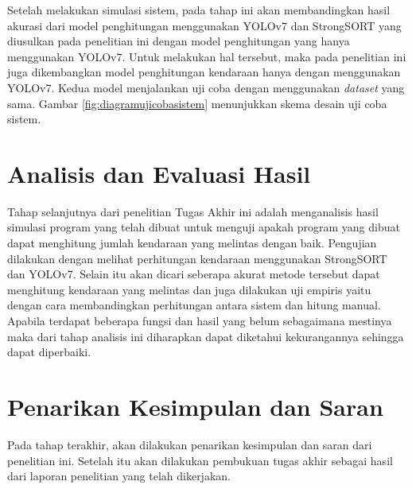 Setelah melakukan simulasi sistem, pada tahap ini akan membandingkan hasil akurasi dari model penghitungan menggunakan YOLOv7 dan StrongSORT yang diusulkan pada penelitian ini dengan model penghitungan yang hanya menggunakan YOLOv7. Untuk melakukan hal tersebut, maka pada penelitian ini juga dikembangkan model penghitungan kendaraan hanya dengan menggunakan YOLOv7. Kedua model menjalankan uji coba dengan menggunakan \emph{dataset} yang sama. Gambar \ref{fig:diagramujicobasistem} menunjukkan skema desain uji coba sistem.

\section{Analisis dan Evaluasi Hasil}
Tahap selanjutnya dari penelitian Tugas Akhir ini adalah 
menganalisis hasil simulasi program yang telah dibuat untuk 
menguji apakah program yang dibuat dapat menghitung jumlah kendaraan yang melintas dengan baik. Pengujian dilakukan dengan melihat perhitungan kendaraan menggunakan StrongSORT dan YOLOv7. Selain itu akan dicari seberapa akurat metode tersebut dapat menghitung kendaraan yang melintas dan juga dilakukan uji empiris yaitu dengan cara membandingkan perhitungan antara sistem dan hitung manual. Apabila terdapat beberapa fungsi dan hasil yang belum sebagaimana mestinya maka dari tahap analisis ini diharapkan dapat diketahui kekurangannya sehingga dapat diperbaiki.


\section{Penarikan Kesimpulan dan Saran}

Pada tahap terakhir, akan dilakukan penarikan kesimpulan dan saran dari penelitian ini. Setelah itu akan dilakukan pembukuan tugas akhir sebagai hasil dari laporan penelitian yang telah dikerjakan.
\newpage